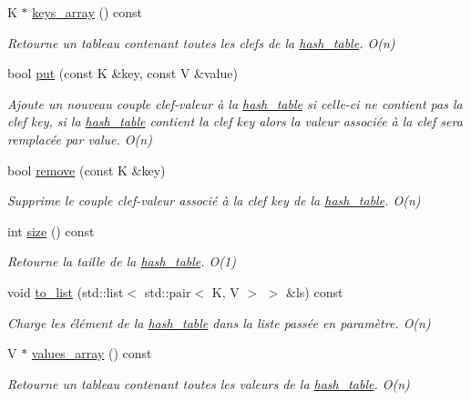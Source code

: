 \begin{DoxyCompactItemize}
K $\ast$ \hyperlink{classhash__table_aa65cffb759b4b5f480e71bf59f8268db}{keys\-\_\-array} () const 
\begin{DoxyCompactList}\small\item\em Retourne un tableau contenant toutes les clefs de la \hyperlink{classhash__table}{hash\-\_\-table}. O(n) \end{DoxyCompactList}\item 
bool \hyperlink{classhash__table_a91998dee99f2f09b0cff2ff578724edf}{put} (const K \&key, const V \&value)
\begin{DoxyCompactList}\small\item\em Ajoute un nouveau couple clef-\/valeur à la \hyperlink{classhash__table}{hash\-\_\-table} si celle-\/ci ne contient pas la clef key, si la \hyperlink{classhash__table}{hash\-\_\-table} contient la clef key alors la valeur associée à la clef sera remplacée par value. O(n) \end{DoxyCompactList}\item 
bool \hyperlink{classhash__table_a7d5896c24c5bf2518fa3c211063879cf}{remove} (const K \&key)
\begin{DoxyCompactList}\small\item\em Supprime le couple clef-\/valeur associé à la clef key de la \hyperlink{classhash__table}{hash\-\_\-table}. O(n) \end{DoxyCompactList}\item 
int \hyperlink{classhash__table_a29adbf3e008c66febacaf7244df2020d}{size} () const 
\begin{DoxyCompactList}\small\item\em Retourne la taille de la \hyperlink{classhash__table}{hash\-\_\-table}. O(1) \end{DoxyCompactList}\item 
void \hyperlink{classhash__table_a145a21bb34e6d95f5adbe0d66b983871}{to\-\_\-list} (std\-::list$<$ std\-::pair$<$ K, V $>$ $>$ \&ls) const 
\begin{DoxyCompactList}\small\item\em Charge les élément de la \hyperlink{classhash__table}{hash\-\_\-table} dans la liste passée en paramètre. O(n) \end{DoxyCompactList}\item 
V $\ast$ \hyperlink{classhash__table_a8ec288028398a823c9c3450afbf4592f}{values\-\_\-array} () const 
\begin{DoxyCompactList}\small\item\em Retourne un tableau contenant toutes les valeurs de la \hyperlink{classhash__table}{hash\-\_\-table}. O(n) \end{DoxyCompactList}\end{DoxyCompactItemize}


